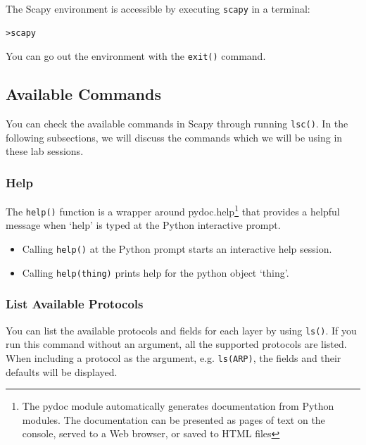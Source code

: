 \documentclass[11pt,a4paper]{article}
\begin{document}
The Scapy environment is accessible by executing \texttt{scapy} in a terminal:
%
\begin{lstlisting}
>scapy 
\end{lstlisting}
%
You can go out the environment with the \texttt{exit()} command.

\subsection{Available Commands}
You can check the available commands in Scapy through running \texttt{lsc()}. In the following subsections, we will discuss the commands which we will be using in these lab sessions.

\subsubsection{Help}
The \texttt{help()} function is a wrapper around pydoc.help\footnote{The pydoc module automatically generates documentation from Python modules. The documentation can be presented as pages of text on the console, served to a Web browser, or saved to HTML files} that provides a helpful message when `help' is typed at the Python interactive prompt.

\begin{itemize}
  \item Calling \texttt{help()} at the Python prompt starts an interactive help session.
  \item Calling \texttt{help(thing)} prints help for the python object `thing'.
\end{itemize}

\subsubsection{List Available Protocols}
You can list the available protocols and fields for each layer by using \texttt{ls()}. 
If you run this command without an argument, all the supported protocols are listed.
When including a protocol as the argument, e.g. \texttt{ls(ARP)}, the fields and their defaults will be displayed.

\end{document}
